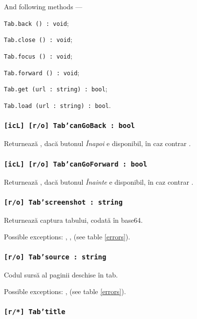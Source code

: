 And following methods —
\begin{icItems}
	\item \texttt{Tab.back () : void};
	\item \texttt{Tab.close () : void};
	\item \texttt{Tab.focus () : void};
	\item \texttt{Tab.forward () : void};
	\item \texttt{Tab.get (url : string) : bool};
	\item \texttt{Tab.load (url : string) : bool}.
\end{icItems}

\subsubsection{\texttt{[icL] [r/o] Tab'canGoBack : bool}}

Returnează \true, dacă butonul \textit{Înapoi} e disponibil, în caz contrar \false.

\subsubsection{\texttt{[icL] [r/o] Tab'canGoForward : bool}}

Returnează \true, dacă butonul \textit{Înainte} e disponibil, în caz contrar \false.

\subsubsection{\texttt{[r/o] Tab'screenshot : string}}

Returnează captura tabului, codată în base64.

Possible exceptions: , ,  (see table \ref{errors}).

\subsubsection{\texttt{[r/o] Tab'source : string}}

Codul sursă al paginii deschise în tab.

Possible exceptions: ,  (see table \ref{errors}).

\subsubsection{\texttt{[r/*] Tab'title}}

